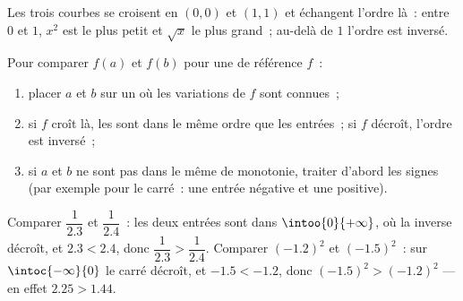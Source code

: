 \begin{omfigure}

{\small Les trois courbes se croisent en $(0,0)$ et $(1,1)$ et
échangent l'ordre là~: entre $0$ et $1$, $x^2$ est le plus petit et
$\sqrt x$ le plus grand~; au-delà de $1$ l'ordre est inversé.}
\end{omfigure}

\begin{method}\label{met:g10:reffunc:compare}
Pour comparer $f(a)$ et $f(b)$ pour une  de référence $f$~:
\begin{enumerate}
  \item placer $a$ et $b$ sur un  où les variations de $f$
        sont connues~;
  \item si $f$ croît là, les  sont dans le même ordre que les
        entrées~; si $f$ décroît, l'ordre est inversé~;
  \item si $a$ et $b$ ne sont pas dans le même  de monotonie,
        traiter d'abord les signes (par exemple pour le carré~: une
        entrée négative et une positive).
\end{enumerate}
\end{method}

\begin{example}
Comparer $\dfrac{1}{2.3}$ et $\dfrac{1}{2.4}$~: les deux entrées sont
dans $\intoo{0}{+\infty}$, où la  inverse décroît, et
$2.3 < 2.4$, donc $\dfrac{1}{2.3} > \dfrac{1}{2.4}$. Comparer
$(-1.2)^2$ et $(-1.5)^2$~: sur $\intoc{-\infty}{0}$ le carré décroît, et
$-1.5 < -1.2$, donc $(-1.5)^2 > (-1.2)^2$ --- en effet $2.25 > 1.44$.
\end{example}

